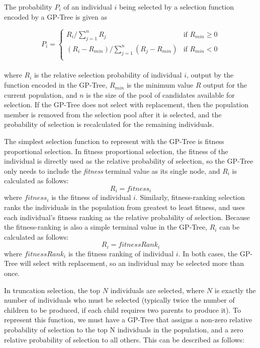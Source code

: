 \documentclass[sigconf]{acmart}
\begin{document}
The probability $P_i$ of an individual $i$ being selected by a selection function encoded by a GP-Tree is given as

\begin{equation}
  P_i =
  \begin{cases}
    R_i / \sum_{j=1}^n R_j & \text{if $R_{min}\geq0$} \\
    (R_i - R_{min}) / \sum_{j=1}^n (R_j - R_{min}) & \text{if $R_{min}<0$} \\
  \end{cases}
\end{equation}
\\

\noindent where $R_i$ is the relative selection probability of individual $i$, output by the function encoded in the GP-Tree, $R_{min}$ is the minimum value $R$ output for the current population, and $n$ is the size of the pool of candidates available for selection. If the GP-Tree does not select with replacement, then the population member is removed from the selection pool after it is selected, and the probability of selection is recalculated for the remaining individuals.

The simplest selection function to represent with the GP-Tree is fitness proportional selection. In fitness proportional selection, the fitness of the individual is directly used as the relative probability of selection, so the GP-Tree only needs to include the \textit{fitness} terminal value as its single node, and $R_i$ is calculated as follows:
\begin{equation}
	R_i = fitness_i
\end{equation}
where $fitness_i$ is the fitness of individual $i$. Similarly, fitness-ranking selection ranks the individuals in the population from greatest to least fitness, and uses each individual's fitness ranking as the relative probability of selection. Because the fitness-ranking is also a simple terminal value in the GP-Tree, $R_i$ can be calculated as follows:
\begin{equation}
	R_i = fitnessRank_i
\end{equation}
where $fitnessRank_i$ is the fitness ranking of individual $i$. In both cases, the GP-Tree will select with replacement, so an individual may be selected more than once.

In truncation selection, the top $N$ individuals are selected, where $N$ is exactly the number of individuals who must be selected (typically twice the number of children to be produced, if each child requires two parents to produce it). To represent this function, we must have a GP-Tree that assigns a non-zero relative probability of selection to the top N individuals in the population, and a zero relative probability of selection to all others. This can be described as follows:
 
\end{document}
